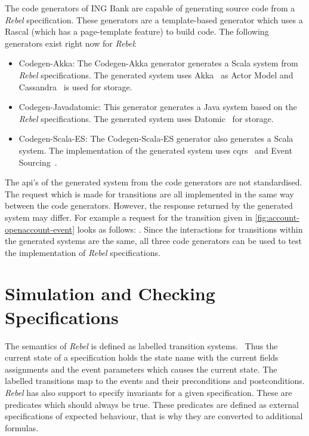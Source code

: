 The code generators of ING Bank are capable of generating source code from a
\textit{Rebel} specification. These generators are a template-based generator
which uses a Rascal (which has a page-template feature)\cite{RascalGTTSE} to
build code. The following generators exist right now for \textit{Rebel}:
\begin{itemize}

\item Codegen-Akka: The Codegen-Akka generator generates a Scala system from
\textit{Rebel} specifications. The generated system uses
Akka~\cite[p.~4]{roestenburg2016akka} as Actor Model and
Cassandra~\cite{lakshman2010cassandra} is used for storage.

\item Codegen-Javadatomic: This generator generates a Java system based on the
\textit{Rebel} specifications. The generated system uses
Datomic~\cite[p.~170-172]{anderson2016professional} for storage.

\item Codegen-Scala-ES: The Codegen-Scala-ES generator also generates a Scala
system. The implementation of the generated system uses
\gls{cqrs}~\cite{fowler2011cqrs} and Event Sourcing~\cite{fowler2005event}.

\end{itemize}

The \gls{api}'s of the generated system from the code generators are not
standardised. The request which is made for transitions are all implemented in
the same way between the code generators. However, the response returned by the
generated system may differ. For example a request for the transition given in
\autoref{fig:account-openaccount-event} looks as follows:
. Since the
interactions for transitions within the generated systems are the same, all
three code generators can be used to test the implementation of \textit{Rebel}
specifications.

\section{Simulation and Checking Specifications}


The semantics of \textit{Rebel} is defined as labelled transition
systems.~\cite[p.~5]{stoel_storm_vinju_bosman_2016} Thus the current state of a
specification holds the state name with the current fields assignments and the
event parameters which causes the current state. The labelled transitions map
to the events and their preconditions and postconditions. \textit{Rebel} has
also support to specify invariants for a given specification. These are
predicates which should always be true. These predicates are defined as external
specifications of expected behaviour, that is why they are converted to
additional formulas.


